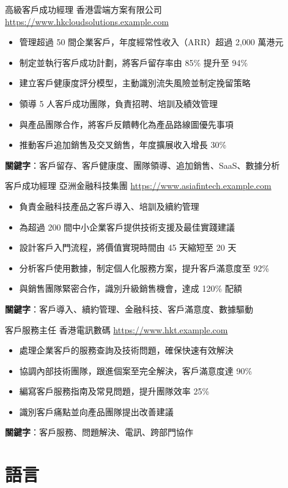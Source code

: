\documentclass[a4paper, serif, 10pt]{moderncv}
\begin{document}
        {高級客戶成功經理}
        {香港雲端方案有限公司}
        {\url{https://www.hkcloudsolutions.example.com}}
        {}
        {\begin{itemize}
\item 管理超過 50 間企業客戶，年度經常性收入（ARR）超過 2,000 萬港元
\item 制定並執行客戶成功計劃，將客戶留存率由 85\% 提升至 94\%
\item 建立客戶健康度評分模型，主動識別流失風險並制定挽留策略
\item 領導 5 人客戶成功團隊，負責招聘、培訓及績效管理
\item 與產品團隊合作，將客戶反饋轉化為產品路線圖優先事項
\item 推動客戶追加銷售及交叉銷售，年度擴展收入增長 30\%
\end{itemize}
\textbf{關鍵字}：客戶留存、客戶健康度、團隊領導、追加銷售、SaaS、數據分析}

        {客戶成功經理}
        {亞洲金融科技集團}
        {\url{https://www.asiafintech.example.com}}
        {}
        {\begin{itemize}
\item 負責金融科技產品之客戶導入、培訓及續約管理
\item 為超過 200 間中小企業客戶提供技術支援及最佳實踐建議
\item 設計客戶入門流程，將價值實現時間由 45 天縮短至 20 天
\item 分析客戶使用數據，制定個人化服務方案，提升客戶滿意度至 92\%
\item 與銷售團隊緊密合作，識別升級銷售機會，達成 120\% 配額
\end{itemize}
\textbf{關鍵字}：客戶導入、續約管理、金融科技、客戶滿意度、數據驅動}

        {客戶服務主任}
        {香港電訊數碼}
        {\url{https://www.hkt.example.com}}
        {}
        {\begin{itemize}
\item 處理企業客戶的服務查詢及技術問題，確保快速有效解決
\item 協調內部技術團隊，跟進個案至完全解決，客戶滿意度達 90\%
\item 編寫客戶服務指南及常見問題，提升團隊效率 25\%
\item 識別客戶痛點並向產品團隊提出改善建議
\end{itemize}
\textbf{關鍵字}：客戶服務、問題解決、電訊、跨部門協作}
\section{語言}
\end{document}

